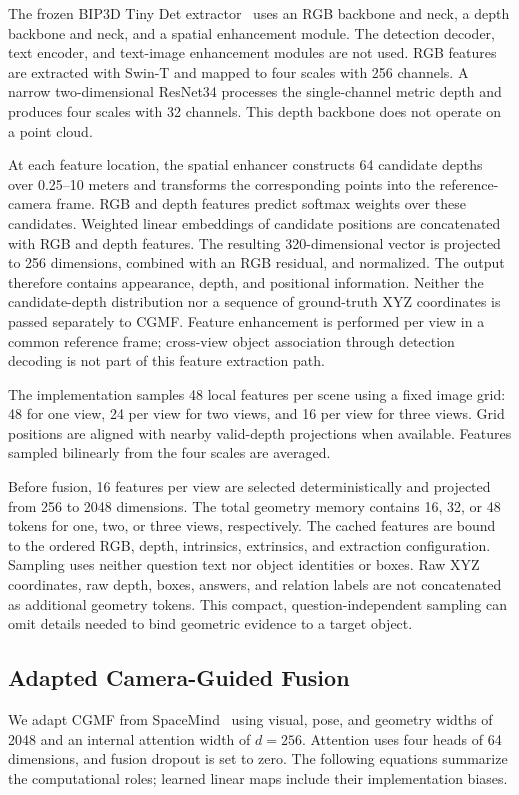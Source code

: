 The frozen BIP3D Tiny Det extractor~\cite{bip3d} uses an RGB backbone and neck, a depth backbone and neck, and a spatial enhancement module. The detection decoder, text encoder, and text-image enhancement modules are not used. RGB features are extracted with Swin-T and mapped to four scales with 256 channels. A narrow two-dimensional ResNet34 processes the single-channel metric depth and produces four scales with 32 channels. This depth backbone does not operate on a point cloud.

At each feature location, the spatial enhancer constructs 64 candidate depths over 0.25--10 meters and transforms the corresponding points into the reference-camera frame. RGB and depth features predict softmax weights over these candidates. Weighted linear embeddings of candidate positions are concatenated with RGB and depth features. The resulting 320-dimensional vector is projected to 256 dimensions, combined with an RGB residual, and normalized. The output therefore contains appearance, depth, and positional information. Neither the candidate-depth distribution nor a sequence of ground-truth XYZ coordinates is passed separately to CGMF. Feature enhancement is performed per view in a common reference frame; cross-view object association through detection decoding is not part of this feature extraction path.

The implementation samples 48 local features per scene using a fixed image grid: 48 for one view, 24 per view for two views, and 16 per view for three views. Grid positions are aligned with nearby valid-depth projections when available. Features sampled bilinearly from the four scales are averaged.

Before fusion, 16 features per view are selected deterministically and projected from 256 to 2048 dimensions. The total geometry memory contains 16, 32, or 48 tokens for one, two, or three views, respectively. The cached features are bound to the ordered RGB, depth, intrinsics, extrinsics, and extraction configuration. Sampling uses neither question text nor object identities or boxes. Raw XYZ coordinates, raw depth, boxes, answers, and relation labels are not concatenated as additional geometry tokens. This compact, question-independent sampling can omit details needed to bind geometric evidence to a target object.

\subsection{Adapted Camera-Guided Fusion}
We adapt CGMF from SpaceMind~\cite{spacemind} using visual, pose, and geometry widths of 2048 and an internal attention width of $d=256$. Attention uses four heads of 64 dimensions, and fusion dropout is set to zero. The following equations summarize the computational roles; learned linear maps include their implementation biases.

